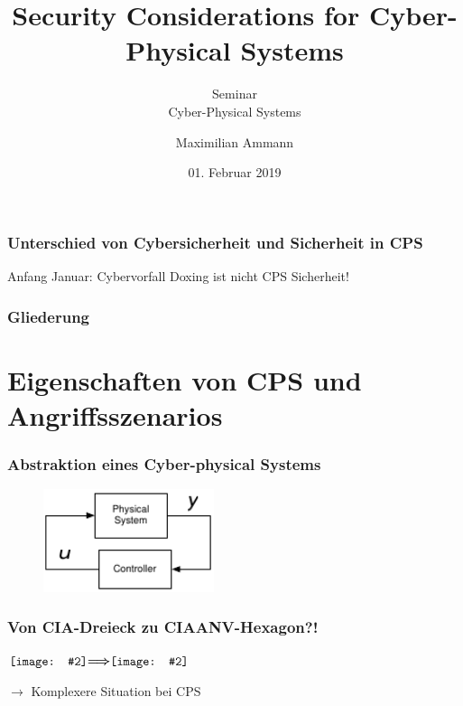 \documentclass{sikslides}
\title[Security Considerations for CPS]{Security Considerations for Cyber-Physical Systems}
\subtitle{Seminar \\Cyber-Physical Systems} %
\author{Maximilian Ammann}
\date[01.02.2019]{01. Februar 2019}
\newcommand*{\vcenterimage}[2]{\vcenter{\hbox{\texttt{[image: \#2]}}}}
\newcommand*{\vcenterarrow}{\vcenter{\hbox{$\bm{\Longrightarrow}$}}}
\begin{document}
    \titleframe

    \begin{frame}
        \frametitle{Unterschied von Cybersicherheit und Sicherheit in CPS}
        Anfang Januar: Cybervorfall Doxing ist nicht CPS Sicherheit!
    \end{frame}

    \begin{frame}
        \frametitle{Gliederung}
        \tableofcontents
    \end{frame}

    \section{Eigenschaften von CPS und Angriffsszenarios}

    \begin{frame}[label=abstrakt]
        \frametitle{Abstraktion eines Cyber-physical Systems}
        \begin{figure}
            \centering
            \includegraphics[width=5cm]{../figure/abstrakt}
            \label{fig:abstrakt}
        \end{figure}
    \end{frame}

    \begin{frame}
        \frametitle{Von CIA-Dreieck zu CIAANV-Hexagon?!}
        \centering
        $\vcenterimage{2.5cm}{../figure/cia}\vcenterarrow\vcenterimage{3.5cm}{../figure/triad}$

        \vspace{40px}
        $\rightarrow$ Komplexere Situation bei CPS
    \end{frame}
\end{document}
